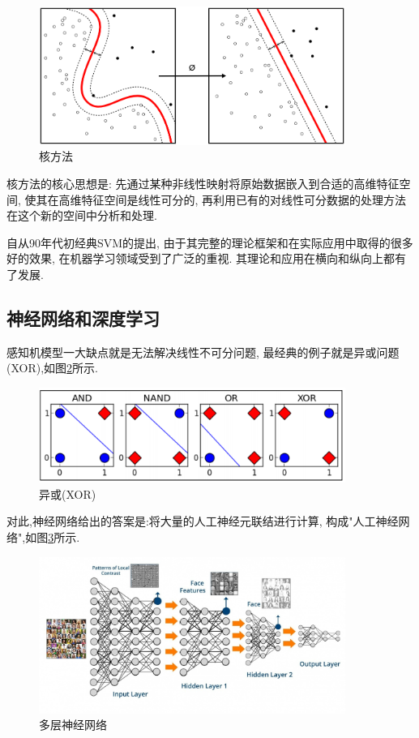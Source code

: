 \documentclass[a4paper,12pt]{article}
\begin{document}
			\begin{figure}[htbp]
				\centering
				\includegraphics[width=10cm]{./fig/Kernel.png}
				\caption{核方法}\label{fig:kernel}
			\end{figure}
			
			核方法的核心思想是:
			先通过某种非线性映射将原始数据嵌入到合适的高维特征空间,
			使其在高维特征空间是线性可分的,
			再利用已有的对线性可分数据的处理方法
			在这个新的空间中分析和处理.

			自从90年代初经典SVM的提出,
			由于其完整的理论框架和在实际应用中取得的很多好的效果,
			在机器学习领域受到了广泛的重视.
			其理论和应用在横向和纵向上都有了发展.

		\subsection{神经网络和深度学习}
			
			感知机模型一大缺点就是无法解决线性不可分问题,
			最经典的例子就是异或问题(XOR),如图\ref{fig:XOR}所示.
			\begin{figure}[htbp]
				\centering
				\includegraphics[width=10cm]{./fig/XOR.png}
				\caption{异或(XOR)}\label{fig:XOR}
			\end{figure}

			对此,神经网络给出的答案是:将大量的人工神经元联结进行计算,
			构成"人工神经网络",如图\ref{fig:net}所示.
			
			\begin{figure}[htbp]
				\centering
				\includegraphics[width=10cm]{./fig/net.jpg}
				\caption{多层神经网络}\label{fig:net}
			\end{figure}
\end{document}
